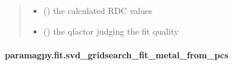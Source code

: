 \documentclass[a4paper,10pt,english,openany,oneside]{sphinxmanual}
\begin{document}
\begin{fulllineitems}
\begin{quote}
\begin{description}
\begin{itemize}
\item {} 
 () \textendash{} the calculated RDC values

\item {} 
 () \textendash{} the qfactor judging the fit quality

\end{itemize}


\end{description}\end{quote}

\end{fulllineitems}



\paragraph{paramagpy.fit.svd\_gridsearch\_fit\_metal\_from\_pcs}
\label{\detokenize{reference/generated/paramagpy.fit.svd_gridsearch_fit_metal_from_pcs:paramagpy-fit-svd-gridsearch-fit-metal-from-pcs}}\label{\detokenize{reference/generated/paramagpy.fit.svd_gridsearch_fit_metal_from_pcs::doc}}
\end{document}
